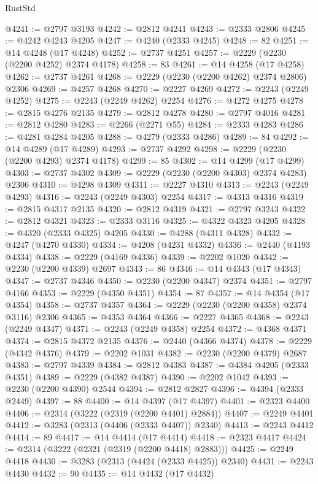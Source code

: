 \begin{lexlean}{RustStd}
\begin{coremodule}
{\begin{coremodule}
{{{{{{{{{{{{{{{{{{{{{{{{{{{{{{{{{{@4241 := @2797 @3193
@4242 := @2812 @4241
@4243 := @2333 @2806
@4245 := @4242 @4243 @4205
@4247 := @4240 (@2333 @4245)
@4248 := 82
@4251 := @14 @4248 (@17 @4248)
@4252 := @2737 @4251
@4257 := @2229 (@2230 (@2200 @4252) @2374 @4178)
@4258 := 83
@4261 := @14 @4258 (@17 @4258)
@4262 := @2737 @4261
@4268 := @2229 (@2230 (@2200 @4262) @2374 @2806) @2306
@4269 := @4257 @4268
@4270 := @2227 @4269
@4272 := @2243 (@2249 @4252)
@4275 := @2243 (@2249 @4262) @2254
@4276 := @4272 @4275
@4278 := @2815 @4276 @2135
@4279 := @2812 @4278
@4280 := @2797 @4016
@4281 := @2812 @4280
@4283 := @2266 (@2271 @55)
@4284 := @2333 @4283
@4286 := @4281 @4284 @4205
@4288 := @4279 (@2333 @4286)
@4289 := 84
@4292 := @14 @4289 (@17 @4289)
@4293 := @2737 @4292
@4298 := @2229 (@2230 (@2200 @4293) @2374 @4178)
@4299 := 85
@4302 := @14 @4299 (@17 @4299)
@4303 := @2737 @4302
@4309 := @2229 (@2230 (@2200 @4303) @2374 @4283) @2306
@4310 := @4298 @4309
@4311 := @2227 @4310
@4313 := @2243 (@2249 @4293)
@4316 := @2243 (@2249 @4303) @2254
@4317 := @4313 @4316
@4319 := @2815 @4317 @2135
@4320 := @2812 @4319
@4321 := @2797 @3243
@4322 := @2812 @4321
@4323 := @2333 @3116
@4325 := @4322 @4323 @4205
@4328 := @4320 (@2333 @4325) @4205
@4330 := @4288 (@4311 @4328)
@4332 := @4247 (@4270 @4330)
@4334 := @4208 (@4231 @4332)
@4336 := @2440 (@4193 @4334)
@4338 := @2229 (@4169 @4336)
@4339 := @2202 @1020
@4342 := @2230 (@2200 @4339) @2697
@4343 := 86
@4346 := @14 @4343 (@17 @4343)
@4347 := @2737 @4346
@4350 := @2230 (@2200 @4347) @2374
@4351 := @2797 @4166
@4353 := @2229 (@4350 @4351)
@4354 := 87
@4357 := @14 @4354 (@17 @4354)
@4358 := @2737 @4357
@4364 := @2229 (@2230 (@2200 @4358) @2374 @3116) @2306
@4365 := @4353 @4364
@4366 := @2227 @4365
@4368 := @2243 (@2249 @4347)
@4371 := @2243 (@2249 @4358) @2254
@4372 := @4368 @4371
@4374 := @2815 @4372 @2135
@4376 := @2440 (@4366 @4374)
@4378 := @2229 (@4342 @4376)
@4379 := @2202 @1031
@4382 := @2230 (@2200 @4379) @2687
@4383 := @2797 @4339
@4384 := @2812 @4383
@4387 := @4384 @4205 (@2333 @4351)
@4389 := @2229 (@4382 @4387)
@4390 := @2202 @1042
@4393 := @2230 (@2200 @4390) @2544
@4394 := @2812 @2827
@4396 := @4394 (@2333 @2449)
@4397 := 88
@4400 := @14 @4397 (@17 @4397)
@4401 := @2323 @4400
@4406 := @2314 (@3222 (@2319 (@2200 @4401) @2884))
@4407 := @2249 @4401
@4412 := @3283 (@2313 (@4406 (@2333 @4407)) @2340)
@4413 := @2243 @4412
@4414 := 89
@4417 := @14 @4414 (@17 @4414)
@4418 := @2323 @4417
@4424 := @2314 (@3222 (@2321 (@2319 (@2200 @4418) @2883)))
@4425 := @2249 @4418
@4430 := @3283 (@2313 (@4424 (@2333 @4425)) @2340)
@4431 := @2243 @4430
@4432 := 90
@4435 := @14 @4432 (@17 @4432)
}}}}}}}}}}}}}}}}}}}}}}}}}}}}}}}}}}
\end{coremodule}}
\end{coremodule}
\end{lexlean}

